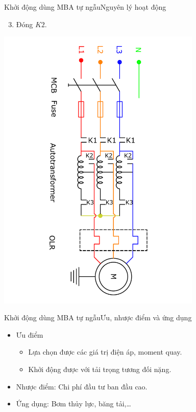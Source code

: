 \documentclass[17pt]{beamer}
\begin{document}
\begin{frame}{Khởi động dùng MBA tự ngẫu}{Nguyên lý hoạt động}
\begin{enumerate}
\setcounter{enumi}{2}
\item Đóng $K2$.
\end{enumerate}
\vspace{-2.5cm}
\begin{center}
\includegraphics[width = 0.73\textwidth,angle=90]{../sodomach/sodomach-bc-chude1-33.pdf}
\end{center}
\end{frame}

\begin{frame}[t]{Khởi động dùng MBA tự ngẫu}{Ưu, nhược điểm và ứng dụng}
\begin{itemize}
\item \alert{Ưu điểm}
\begin{itemize}
\item Lựa chọn được các giá trị điện áp, moment quay.
\item Khởi động được với tải trọng tương đối nặng.
\end{itemize}
\item \alert{Nhược điểm}: Chi phí đầu tư ban đầu cao.
\item \alert{Ứng dụng}: Bơm thủy lực, băng tải,\ldots
\end{itemize}
\end{frame}
\end{document}
